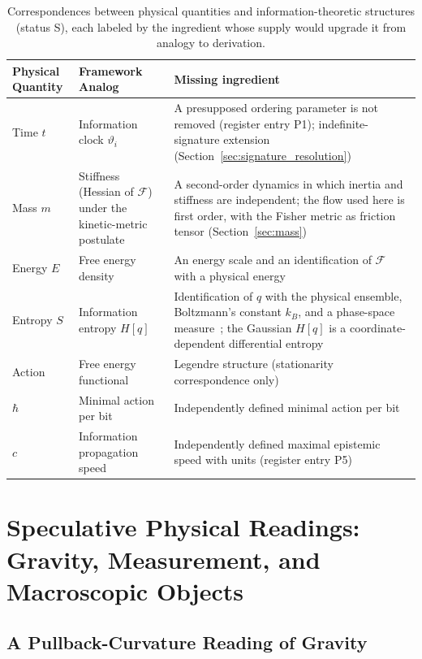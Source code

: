 \documentclass[11pt]{article}
\begin{document}
\begin{table}[h]
\centering
\begin{tabularx}{\linewidth}{|l|X|X|}
\hline
\textbf{Physical Quantity} & \textbf{Framework Analog} & \textbf{Missing ingredient} \\
\hline
Time $t$ & Information clock $\vartheta_i$ & A presupposed ordering parameter is not removed (register entry P1); indefinite-signature extension (Section~\ref{sec:signature_resolution}) \\
Mass $m$ & Stiffness (Hessian of $\mathcal{F}$) under the kinetic-metric postulate & A second-order dynamics in which inertia and stiffness are independent; the flow used here is first order, with the Fisher metric as friction tensor (Section~\ref{sec:mass}) \\
Energy $E$ & Free energy density & An energy scale and an identification of $\mathcal{F}$ with a physical energy \\
Entropy $S$ & Information entropy $H[q]$ & Identification of $q$ with the physical ensemble, Boltzmann's constant $k_B$, and a phase-space measure~\cite{Jaynes1957}; the Gaussian $H[q]$ is a coordinate-dependent differential entropy \\
Action & Free energy functional & Legendre structure (stationarity correspondence only) \\
$\hbar$ & Minimal action per bit & Independently defined minimal action per bit \\
$c$ & Information propagation speed & Independently defined maximal epistemic speed with units (register entry P5) \\
\hline
\end{tabularx}
\caption{Correspondences between physical quantities and information-theoretic structures (status S), each labeled by the ingredient whose supply would upgrade it from analogy to derivation.}
\label{tab:physical_correspondences}
\end{table}

\section{Speculative Physical Readings: Gravity, Measurement, and Macroscopic Objects}\label{sec:speculative_physics}

\subsection{A Pullback-Curvature Reading of Gravity}
\label{sec:gravity_pullback}
\end{document}
